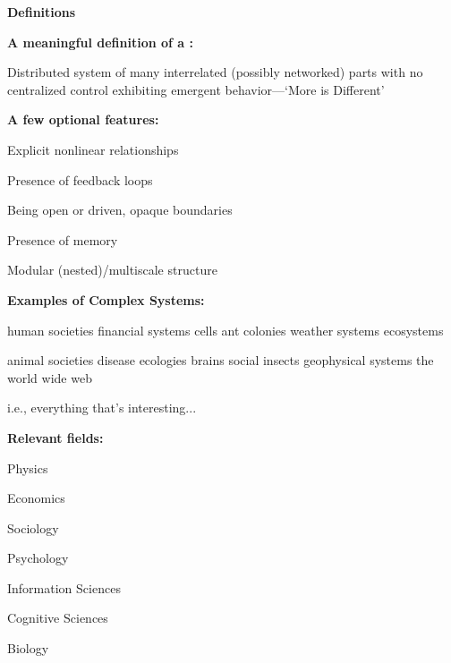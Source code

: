   \textbf{Definitions}


  \textbf{A meaningful definition of a :}
    
    
      Distributed system of many interrelated (possibly networked) parts
      with no centralized control
      exhibiting 
      emergent behavior---`More is Different'\cite{anderson1972a}
        
  

  \textbf{A few optional features:}
    
    
      Explicit nonlinear relationships
    
      Presence of feedback loops
    
      Being open or driven, opaque boundaries
    
      Presence of memory
    
      Modular (nested)/multiscale structure
    
  



  \textbf{Examples of Complex Systems:}

  
        
         human societies 
         financial systems
         cells     
         ant colonies 
         weather systems 
         ecosystems     
        
        
         animal societies     
         disease ecologies    
         brains               
         social insects       
         geophysical systems  
         the world wide web   
        
  

  
  
    i.e., everything that's interesting...
  



  \textbf{Relevant fields:}

  
          
      
       
        Physics
       
        Economics
       
        Sociology
       
        Psychology
       
        Information Sciences
      
      
      
      
       
        Cognitive Sciences
       
        Biology
       
